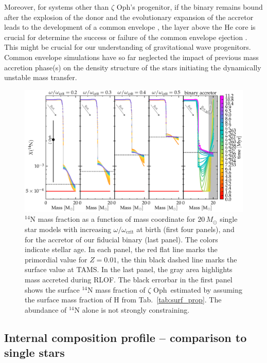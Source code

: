 \documentclass[twocolumn,twocolappendix,trackchanges]{aastex63}
\DeclareRobustCommand{\Tabref}[1]{Tab.~\ref{#1}}
\newcommand{\zoph}{$\zeta$ Oph}
\begin{document}
Moreover, for systems other than \zoph's progenitor, if the
binary remains bound after the explosion of the donor and the
evolutionary expansion of the accretor leads to the development of a common envelope
\citep[e.g.,][]{paczynski:76}, the layer above the He core is crucial
for determine the success or failure of the common envelope
ejection \citep{klencki:21}. This might be
crucial for our understanding of gravitational wave
progenitors. Common envelope simulations have so far neglected the
impact of previous mass accretion phase(s) on the density structure of the stars
initiating the dynamically unstable mass transfer.


\begin{figure}[tbp]
  \centering
  \includegraphics[width=\textwidth]{n14_colored} %
  \caption{$^{14}\mathrm{N}$ mass fraction as a function of mass
    coordinate for $20\,M_\odot$ single star models with increasing
    $\omega/\omega_\mathrm{crit}$ at birth (first four panels), and
    for the accretor of our fiducial binary (last panel). The colors indicate stellar age. In each
    panel, the red flat line marks the primordial value for
    $Z=0.01$, the thin black dashed line marks the surface value at TAMS. In
    the last panel, the gray area highlights mass accreted during
    RLOF. The black errorbar in the first panel shows the surface
    $^{14}\mathrm{N}$ mass fraction of \zoph\ estimated by  assuming
    the surface mass fraction of H from \Tabref{tab:surf_prop}. The
    abundance of $^{14}\mathrm{N}$ alone is not strongly
    constraining.
  }
  \label{fig:n14}
\end{figure}

\subsection{Internal composition profile -- comparison to single stars}
\label{sec:mix_comparison_single}
\end{document}
